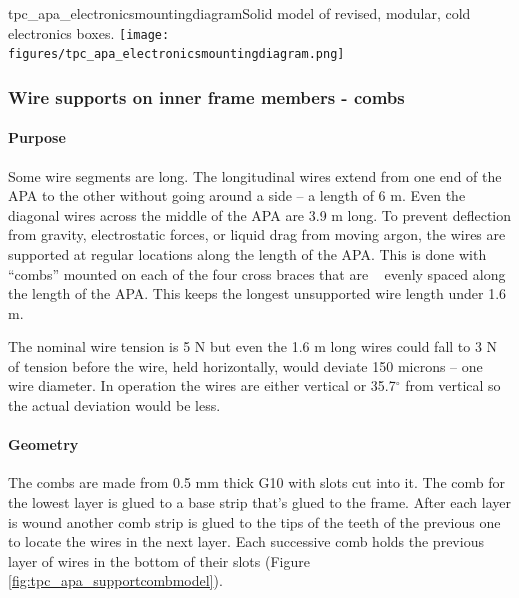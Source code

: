 \begin{cdrfigure}{tpc_apa_electronicsmountingdiagram}{Solid model of revised, modular, cold electronics boxes.}
\texttt{[image: figures/tpc\_apa\_electronicsmountingdiagram.png]} 
\end{cdrfigure}

\subsubsection{Wire supports on inner frame members - combs}
\label{subsec:apa_combs}

\paragraph{Purpose}

Some wire segments are long.  The longitudinal wires extend from one end of the APA to the other without going around a side -- a length of 6 m.  Even the diagonal wires across the middle of the APA are 3.9 m long.  To prevent deflection from gravity, electrostatic forces, or liquid drag from moving argon, the wires are supported at regular locations along the length of the APA.  This is done with ``combs'' mounted on each of the four cross braces that are ~ evenly spaced along the length of the APA.  This keeps the longest unsupported wire length under 1.6 m.

The nominal wire tension is 5 N but even the 1.6 m long wires could fall to 3 N of tension before the wire, held horizontally, would deviate 150 microns -- one wire diameter.  In operation the wires are either vertical or 35.7$^{\circ}$ from vertical so the actual deviation would be less.

\paragraph{Geometry}

The combs are made from 0.5 mm thick G10 with slots cut into it.  The comb for the lowest layer is glued to a base strip that's glued to the frame.  After each layer is wound another comb strip is glued to the tips of the teeth of the previous one to locate the wires in the next layer.  Each successive comb holds the previous layer of wires in the bottom of their slots (Figure \ref{fig:tpc_apa_supportcombmodel}).

